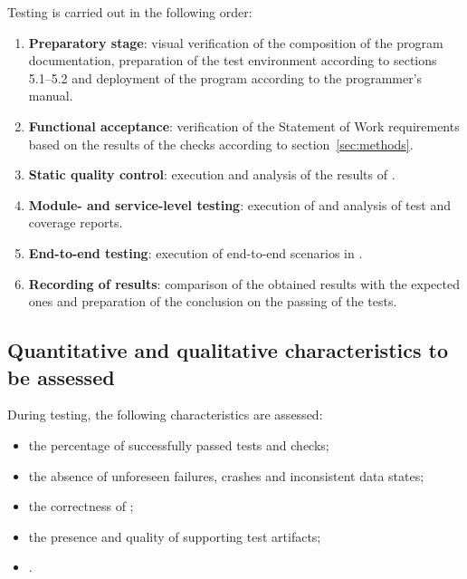 \documentclass[12pt,a4paper]{extarticle}
\begin{document}
\begin{hseExample}
Testing is carried out in the following order:

\begin{enumerate}[label=\arabic*), leftmargin=1.25cm]
    \item \textbf{Preparatory stage}: visual verification of the composition of the program documentation, preparation of the test environment according to sections 5.1--5.2 and deployment of the program according to the programmer's manual.
    \item \textbf{Functional acceptance}: verification of the Statement of Work requirements based on the results of the checks according to section~\ref{sec:methods}.
    \item \textbf{Static quality control}: execution and analysis of the results of .
    \item \textbf{Module- and service-level testing}: execution of  and analysis of test and coverage reports.
    \item \textbf{End-to-end testing}: execution of end-to-end scenarios in .
    \item \textbf{Recording of results}: comparison of the obtained results with the expected ones and preparation of the conclusion on the passing of the tests.
\end{enumerate}
\end{hseExample}

\subsection{Quantitative and qualitative characteristics to be assessed}

\begin{hseExample}
During testing, the following characteristics are assessed:

\begin{itemize}[leftmargin=1.25cm]
    \item the percentage of successfully passed tests and checks;
    \item the absence of unforeseen failures, crashes and inconsistent data states;
    \item the correctness of ;
    \item the presence and quality of supporting test artifacts;
    \item {}.
\end{itemize}
\end{hseExample}
\end{document}
